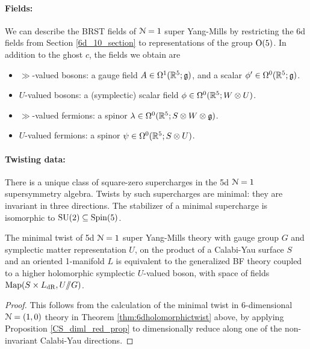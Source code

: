 \documentclass[10pt, oneside]{article}
\newcommand{\ham}{/\!\!/}
\begin{document}
\vspace{-10pt}
\paragraph{Fields:} We can describe the BRST fields of $\mathcal{N}=1$ super Yang-Mills by restricting the 6d fields from Section \ref{6d_10_section} to representations of the group $\mathrm{O}(5)$.  In addition to the ghost $c$, the fields we obtain are
\begin{itemize}
 \item $\gg$-valued bosons: a gauge field $A \in \Omega^1(\mathbb R^5; \mathfrak{g})$, and a scalar $\phi' \in \Omega^0(\mathbb R^5; \mathfrak{g})$.
 \item $U$-valued bosons: a (symplectic) scalar field $\phi \in \Omega^0(\mathbb R^5; W \otimes U)$.
 \item $\gg$-valued fermions: a spinor $\lambda \in \Omega^0(\mathbb R^5; S \otimes W \otimes \mathfrak{g})$.
 \item $U$-valued fermions: a spinor $\psi \in \Omega^0(\mathbb R^5; S \otimes U)$.
\end{itemize}

\vspace{-10pt}
\paragraph{Twisting data:}
There is a unique class of square-zero supercharges in the 5d $\mathcal{N}=1$ supersymmetry algebra.  Twists by such supercharges are minimal: they are invariant in three directions.  The stabilizer of a minimal supercharge is isomorphic to $\mathrm{SU}(2) \subseteq \mathrm{Spin}(5)$.

\begin{theorem} \label{5d_holo_twist_theorem}
The minimal twist of 5d $\mathcal{N}=1$ super Yang-Mills theory with gauge group $G$ and symplectic matter representation $U$, on the product of a Calabi-Yau surface $S$ and an oriented 1-manifold $L$ is equivalent to the generalized BF theory coupled to a higher holomorphic symplectic $U$-valued boson, with space of fields $\mr{Map}(S \times L_{\mr{dR}}, U\ham G)$.
\end{theorem}

\begin{proof}
This follows from the calculation of the minimal twist in 6-dimensional $\mathcal{N}=(1,0)$ theory in Theorem \ref{thm:6dholomorphictwist} above, by applying Proposition \ref{CS_diml_red_prop} to dimensionally reduce along one of the non-invariant Calabi-Yau directions.
\end{proof}
\end{document}
